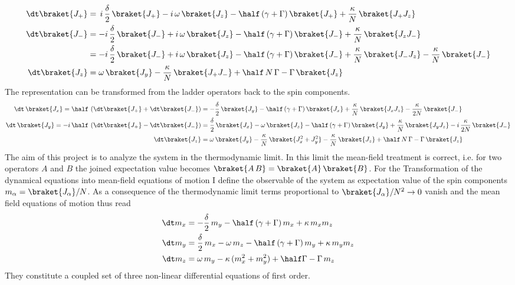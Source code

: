 \begin{align}
    \dt \braket{J_+}&=\,i\,\frac{\delta}{2}\,\braket{J_+}-i\,\omega\,\braket{J_z}-\half\,(\gamma+\Gamma)\,\braket{J_+}+\frac{\kappa}{N}\,\braket{J_+ J_z}\notag\\
    \dt \braket{J_-}&=-i\,\frac{\delta}{2}\,\braket{J_-}+i\,\omega\,\braket{J_z}-\half\,(\gamma+\Gamma)\,\braket{J_-}+\frac{\kappa}{N}\,\braket{J_z J_-}\notag\\
    &=-i\,\frac{\delta}{2}\,\braket{J_-}+i\,\omega\,\braket{J_z}-\half\,(\gamma+\Gamma)\,\braket{J_-}+\frac{\kappa}{N}\,\braket{J_- J_z}-\frac{\kappa}{N}\,\braket{J_-}\notag\\
    \dt \braket{J_z}&=\omega\,\braket{J_y} - \frac{\kappa}{N}\,\braket{J_+ J_-}+\half\,N\,\Gamma-\Gamma\,\braket{J_z}
\end{align}
The representation can be transformed from the ladder operators back to the spin components.
\begin{align*}
    \dt\,\braket{J_x}=\half\,\left(\dt \braket{J_+}+\dt \braket{J_-}\right)&=-\frac{\delta}{2}\,\braket{J_y}-\half\,(\gamma+\Gamma)\,\braket{J_x}+\frac{\kappa}{N}\,\braket{J_xJ_z}-\frac{\kappa}{2N}\,\braket{J_-}\\
    \dt\,\braket{J_y}=-i\,\half\,\left(\dt \braket{J_+}-\dt \braket{J_-}\right)&=\frac{\delta}{2}\,\braket{J_x}-\omega\,\braket{J_z}-\half\,(\gamma+\Gamma)\,\braket{J_y}+\frac{\kappa}{N}\,\braket{J_yJ_z}-i\,\frac{\kappa}{2N}\,\braket{J_-}\\
    \dt \braket{J_z}&=\omega\,\braket{J_y} - \frac{\kappa}{N}\,\braket{J_x^2+J_y^2} -\frac{\kappa}{N}\,\braket{J_z}+\half\,N\,\Gamma-\Gamma\,\braket{J_z}
\end{align*}
The aim of this project is to analyze the system in the thermodynamic limit. In this limit the mean-field treatment is correct, i.e. for two operators $A$ and $B$ the joined expectation value becomes $\braket{A\,B}=\braket{A}\,\braket{B}$. For the Transformation of the dynamical equations into mean-field equations of motion I define the observable of the system as expectation value of the spin components $m_\alpha=\braket{J_\alpha}/N$. As a consequence of the thermodynamic limit terms proportional to $\braket{J_\alpha}/N^2\rightarrow0$ vanish and the mean field equations of motion thus read
\begin{align}
    \dt m_x &= -\frac{\delta}{2}\,m_y-\half\,(\gamma+\Gamma)\,m_x+\kappa\,m_x m_z\notag\\
    \dt m_y &= \frac{\delta}{2}\,m_x-\omega\,m_z-\half\,(\gamma+\Gamma)\,m_y+\kappa\,m_y m_z\notag\\
    \dt m_z &= \omega\,m_y - \kappa\,(m_x^2+m_y^2)+\half\Gamma-\Gamma\,m_z
\end{align}
They constitute a coupled set of three non-linear differential equations of first order.